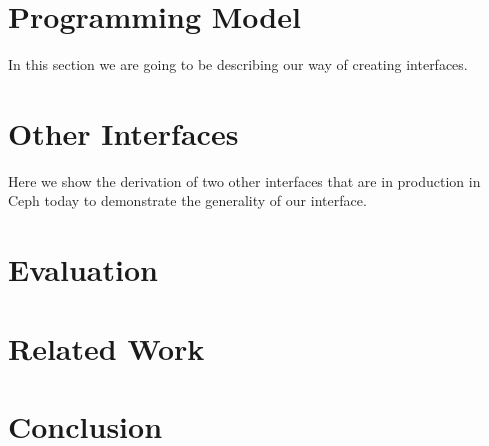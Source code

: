 \documentclass[10pt,twocolumn]{article}
\begin{document}
\section{Programming Model}

In this section we are going to be describing our way of creating interfaces.

\section{Other Interfaces}

Here we show the derivation of two other interfaces that are in production in
Ceph today to demonstrate the generality of our interface.

\section{Evaluation}

\section{Related Work}

\section{Conclusion}

%
%
%
\end{document}
